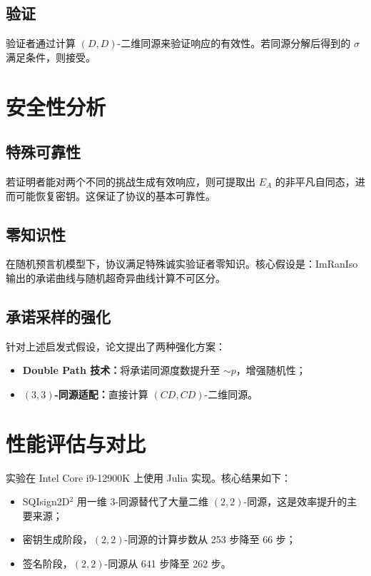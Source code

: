 \documentclass[12pt,a4paper]{ctexart}
\theoremstyle{remark}
\begin{document}
\subsection{验证}

验证者通过计算 $(D,D)$-二维同源来验证响应的有效性。若同源分解后得到的 $\sigma$ 满足条件，则接受。

\section{安全性分析}

\subsection{特殊可靠性}

若证明者能对两个不同的挑战生成有效响应，则可提取出 $E_A$ 的非平凡自同态，进而可能恢复密钥。这保证了协议的基本可靠性。

\subsection{零知识性}

在随机预言机模型下，协议满足特殊诚实验证者零知识。核心假设是：ImRanIso 输出的承诺曲线与随机超奇异曲线计算不可区分。

\subsection{承诺采样的强化}

针对上述启发式假设，论文提出了两种强化方案：
\begin{itemize}
  \item \textbf{Double Path 技术：}将承诺同源度数提升至 $\sim p$，增强随机性；
  \item \textbf{$(3,3)$-同源适配：}直接计算 $(CD, CD)$-二维同源。
\end{itemize}

\section{性能评估与对比}

实验在 Intel Core i9-12900K 上使用 Julia 实现。核心结果如下：
\begin{itemize}
  \item SQIsign2D$^2$ 用一维 3-同源替代了大量二维 $(2,2)$-同源，这是效率提升的主要来源；
  \item 密钥生成阶段，$(2,2)$-同源的计算步数从 253 步降至 66 步；
  \item 签名阶段，$(2,2)$-同源从 641 步降至 262 步。
\end{itemize}
\end{document}
